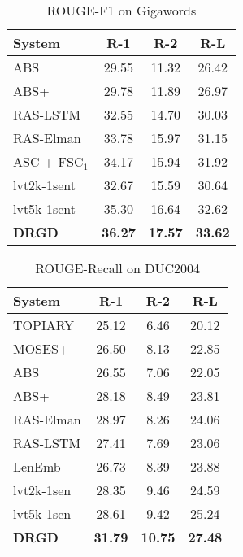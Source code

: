 \documentclass[11pt,letterpaper]{article}
\begin{document}
\begin{table}[!t]
	\centering
	\caption{ROUGE-F1 on Gigawords}
	\label{tab:rouge-agiga}
	\begin{tabular}{p{2.6cm} c c c}
		\hline
		\textbf{System}  & \textbf{R-1} & \textbf{R-2} & \textbf{R-L}  \\
		\hline
		ABS       & 29.55 & 11.32 & 26.42  \\
		ABS+       & 29.78 & 11.89 & 26.97  \\
		RAS-LSTM       & 32.55 & 14.70 & 30.03  \\
		RAS-Elman       & 33.78 & 15.97 & 31.15  \\
		ASC + FSC$_1$       & 34.17 & 15.94 & 31.92  \\
lvt2k-1sent     & 32.67 & 15.59 & 30.64  \\
		lvt5k-1sent     & 35.30 & 16.64 & 32.62  \\
\textbf{DRGD}       & \textbf{36.27} & \textbf{17.57} & \textbf{33.62}  \\
		\hline
	\end{tabular}
\end{table}


\begin{table}[!t]
	\centering
	\caption{ROUGE-Recall on DUC2004}
	\label{tab:rouge-duc04}
	\begin{tabular}{p{2.6cm} c c c}
		\hline
		\textbf{System}  & \textbf{R-1} & \textbf{R-2} & \textbf{R-L} \\
		\hline
		TOPIARY & 25.12 & 6.46 & 20.12  \\
		MOSES+ & 26.50 & 8.13 & 22.85  \\
		ABS       & 26.55 &	7.06 &	22.05  \\
		ABS+       & 28.18 & 8.49 & 23.81  \\
		RAS-Elman       & 28.97 & 8.26 & 24.06  \\
		RAS-LSTM       & 27.41 & 7.69 & 23.06  \\
		LenEmb       & 26.73 & 8.39 & 23.88  \\
		lvt2k-1sen       & 28.35 & 9.46 & 24.59  \\
		lvt5k-1sen & 28.61 & 9.42 & 25.24  \\
		\textbf{DRGD}       & \textbf{31.79} & \textbf{10.75} & \textbf{27.48} \\
		\hline
	\end{tabular}
\end{table}
\end{document}
